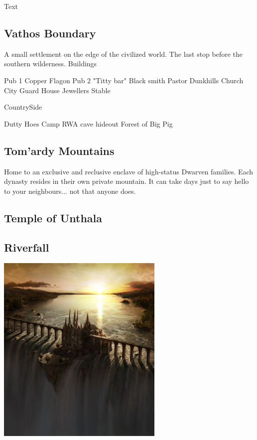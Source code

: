 \noindent 

Text

\smallskip

\subsection*{Vathos Boundary} 

A small settlement on the edge of the civilized world. The last stop before the southern wilderness.
Buildings

    Pub 1 Copper Flagon
    Pub 2 "Titty bar"
    Black smith
    Pastor Dunkhills Church
    City Guard House
    Jewellers
    Stable

CountrySide

    Dutty Hoes Camp
    RWA cave hideout
    Forest of Big Pig


\smallskip

\subsection*{Tom'ardy Mountains} 

Home to an exclusive and reclusive enclave of high-status Dwarven families. Each dynasty resides in their own private mountain. It can take days just to say hello to your neighbours... not that anyone does.

\smallskip

\subsection*{Temple of Unthala} 

\smallskip

\subsection*{Riverfall} 

\vspace{5mm}

\begin{center}
\includegraphics[width=80mm]{./content/img/riverfall.png}
\begin{figure}[h]
\end{figure}
\end{center}

